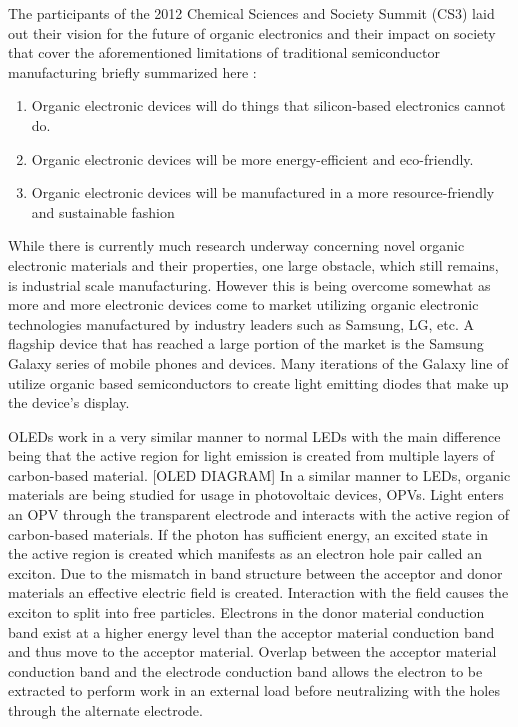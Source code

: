 The participants of the 2012 Chemical Sciences and Society Summit (CS3) laid out their vision for the future of organic electronics and their impact on society that cover the aforementioned limitations of traditional semiconductor manufacturing briefly summarized here \cite{CS3}:
\begin{enumerate}
\item
Organic electronic devices will do things that silicon-based electronics cannot do.

\item
Organic electronic devices will be more energy-efficient and eco-friendly.

\item
Organic electronic devices will be manufactured in a more resource-friendly and sustainable fashion
\end{enumerate}

While there is currently much research underway concerning novel organic electronic materials and their properties, one large obstacle, which still remains, is industrial scale manufacturing. However this is being overcome somewhat as more and more electronic devices come to market utilizing organic electronic technologies manufactured by industry leaders such as Samsung, LG, etc. A flagship device that has reached a large portion of the market is the Samsung Galaxy series of mobile phones and devices. Many iterations of the Galaxy line of utilize organic based semiconductors to create light emitting diodes that make up the device's display. 

OLEDs work in a very similar manner to normal LEDs with the main difference being that the active region for light emission is created from multiple layers of carbon-based material. [OLED DIAGRAM] In a similar manner to LEDs, organic materials are being studied for usage in photovoltaic devices, OPVs. Light enters an OPV through the transparent electrode and interacts with the active region of carbon-based materials. If the photon has sufficient energy, an excited state in the active region is created which manifests as an electron hole pair called an exciton. Due to the mismatch in band structure between the acceptor and donor materials an effective electric field is created. Interaction with the field causes the exciton to split into free particles. Electrons in the donor material conduction band exist at a higher energy level than the acceptor material conduction band and thus move to the acceptor material. Overlap between the acceptor material conduction band and the electrode conduction band allows the electron to be extracted to perform work in an external load before neutralizing with the holes through the alternate electrode.

